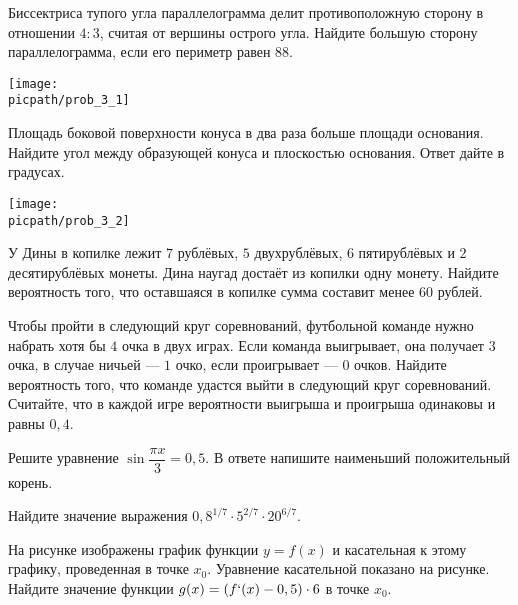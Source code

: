 \begin{class}[number=3]
	\begin{listofex}
		\item
		\begin{minipage}[t]{\bodywidth}
			Биссектриса тупого угла параллелограмма делит противоположную сторону в отношении \( 4 : 3 \), считая от вершины острого угла. Найдите большую сторону параллелограмма, если его периметр равен \( 88 \).
			\foranswer
		\end{minipage}
		\gapwidth
		\begin{minipage}[t]{\picwidth}
			\texttt{[image: \\picpath/prob\_3\_1]}
		\end{minipage}
		\item
		\begin{minipage}[t]{\bodywidth}
			Площадь боковой поверхности конуса в два раза больше площади основания. Найдите угол между образующей конуса и плоскостью основания. Ответ дайте в градусах.
			\foranswer
		\end{minipage}
		\gapwidth
		\begin{minipage}[t]{\picwidth}
			\texttt{[image: \\picpath/prob\_3\_2]}
		\end{minipage}
		\item У Дины в копилке лежит \( 7 \) рублёвых, \( 5 \) двухрублёвых, \( 6 \) пятирублёвых и \( 2 \) десятирублёвых
		монеты. Дина наугад достаёт из копилки одну монету. Найдите вероятность того, что оставшаяся в
		копилке сумма составит менее \( 60 \) рублей.
		\foranswer
		\item Чтобы пройти в следующий круг соревнований, футбольной команде нужно набрать хотя бы \( 4 \)
		очка в двух играх. Если команда выигрывает, она получает \( 3 \) очка, в случае ничьей --- \( 1 \) очко, если
		проигрывает --- \( 0 \) очков.
		Найдите вероятность того, что команде удастся выйти в следующий круг
		соревнований.
		Считайте, что в каждой игре вероятности выигрыша и проигрыша одинаковы и равны \( 0,4 \).
		\foranswer
		\item Решите уравнение \( \sin \dfrac{\pi x}{3}=0,5 \). В ответе напишите наименьший положительный корень.
		\foranswer
		\item Найдите значение выражения \( 0,8^{1/7}\cdot5^{2/7}\cdot20^{6/7} \).
		\item
		\begin{minipage}[t]{\bodywidth}
			На рисунке изображены график функции \( y=f(x) \) и касательная к этому графику, проведенная в точке \( x_0 \). Уравнение касательной показано на рисунке. Найдите значение функции \( g(x)=(f`(x)-0,5)\cdot6 \) в точке \( x_0 \).

\end{minipage}
\end{listofex}
\end{class}

